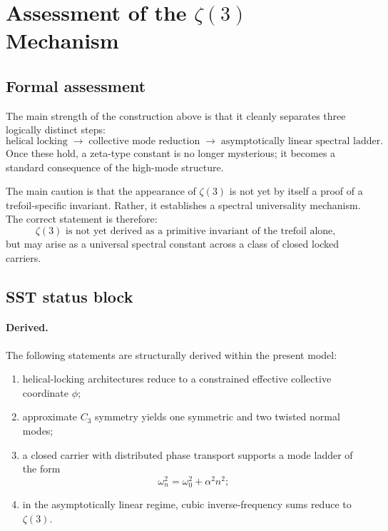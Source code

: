 \documentclass[11pt]{article}
\begin{document}
    \section{Assessment of the \texorpdfstring{$\zeta(3)$}{zeta(3)} Mechanism}
    
    \subsection{Formal assessment}
        
        The main strength of the construction above is that it cleanly separates three logically distinct steps:
        \begin{equation}
            \text{helical locking}
            \;\longrightarrow\;
            \text{collective mode reduction}
            \;\longrightarrow\;
            \text{asymptotically linear spectral ladder}.
        \end{equation}
        Once these hold, a zeta-type constant is no longer mysterious; it becomes a standard consequence of the high-mode structure.
        
        The main caution is that the appearance of \(\zeta(3)\) is not yet by itself a proof of a trefoil-specific invariant. Rather, it establishes a spectral universality mechanism. The correct statement is therefore:
        \begin{equation}
            \zeta(3)
            \text{ is not yet derived as a primitive invariant of the trefoil alone,}
        \end{equation}
        but may arise as a universal spectral constant across a class of closed locked carriers.
    
    \subsection{SST status block}
    
    \paragraph{Derived.}
        The following statements are structurally derived within the present model:
        \begin{enumerate}
            \item helical-locking architectures reduce to a constrained effective collective coordinate \(\phi\);
            \item approximate \(C_3\) symmetry yields one symmetric and two twisted normal modes;
            \item a closed carrier with distributed phase transport supports a mode ladder of the form
            \[
                \omega_n^2=\omega_0^2+\alpha^2 n^2;
            \]
            \item in the asymptotically linear regime, cubic inverse-frequency sums reduce to \(\zeta(3)\).
        \end{enumerate}
    
\end{document}
